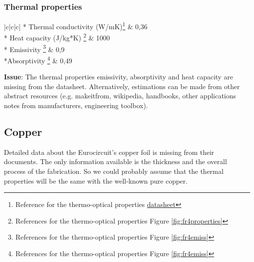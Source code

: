 \documentclass[final]{cubedoc}
\begin{document}
	
	\subsubsection{Thermal properties}
	
	\begin{center}
		\tablehead{\hline}
		\tabletail{\hline}
		\begin{mpsupertabular}{|c|c|c|}
			 {*} {Thermal conductivity (W/mK)\footnote{Reference for the thermo-optical properties \href{https://web.archive.org/web/20200818140113/https://www.isola-group.com/wp-content/uploads/data-sheets/is400.pdf?v=1585950502}{datasheet}}} & 0,36 \\  
			\hline
			 {*} {Heat capacity (J/kg*K) \footnote{References for the thermo-optical properties Figure \ref{fig:fr4properties}}} & 1000 \\ 
			\hline
			 {*} {Emissivity  \footnote{References for the thermo-optical properties Figure \ref{fig:fr4emiss}}} & 0,9  \\
			\hline
			 {*}{Absorptivity  \footnote{References for the thermo-optical properties Figure \ref{fig:fr4emiss}}} & 0,49 \\
			\hline
		\end{mpsupertabular}
	\end{center}
	
	
	
	
	\textbf{Issue}: The thermal properties emissivity, absorptivity and heat capacity are missing from the datasheet. Alternatively, estimations can be made from other abstract resources (e.g. makeitfrom, wikipedia, handbooks, other applications notes from manufacturers, engineering toolbox).
	\newline
	
	
	\subsection{Copper}
	
	Detailed data about the Eurocircuit's copper foil is missing from their documents. The only information available is the thickness and the overall process of the fabrication. So we could probably assume that the thermal properties will be the same with the well-known pure copper.
	
\end{document}
